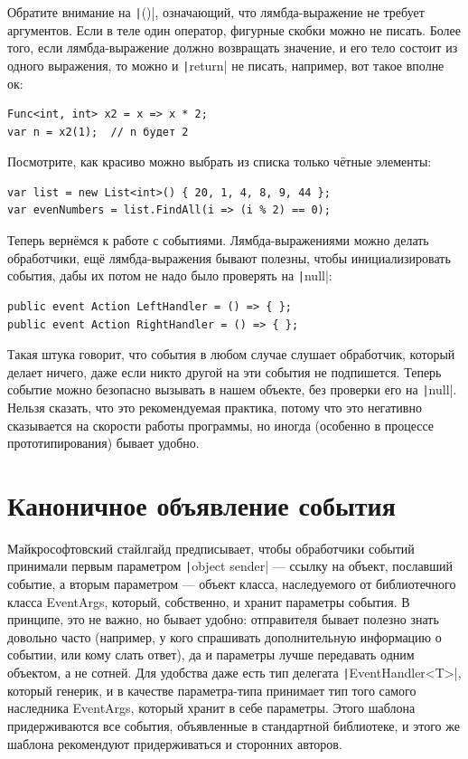 \documentclass[a5paper]{article}
\begin{document}
Обратите внимание на \texttt|()|, означающий, что лямбда-выражение не требует аргументов. Если в теле один оператор, фигурные скобки можно не писать. Более того, если лямбда-выражение должно возвращать значение, и его тело состоит из одного выражения, то можно и \texttt|return| не писать, например, вот такое вполне ок:

\begin{verbatim}
Func<int, int> x2 = x => x * 2;
var n = x2(1);  // n будет 2
\end{verbatim}

Посмотрите, как красиво можно выбрать из списка только чётные элементы:

\begin{verbatim}
var list = new List<int>() { 20, 1, 4, 8, 9, 44 };
var evenNumbers = list.FindAll(i => (i % 2) == 0);
\end{verbatim}

Теперь вернёмся к работе с событиями. Лямбда-выражениями можно делать обработчики, ещё лямбда-выражения бывают полезны, чтобы инициализировать события, дабы их потом не надо было проверять на \texttt|null|:

\begin{verbatim}
public event Action LeftHandler = () => { };
public event Action RightHandler = () => { };
\end{verbatim}

Такая штука говорит, что события в любом случае слушает обработчик, который делает ничего, даже если никто другой на эти события не подпишется. Теперь событие можно безопасно вызывать в нашем объекте, без проверки его на \texttt|null|. Нельзя сказать, что это рекомендуемая практика, потому что это негативно сказывается на скорости работы программы, но иногда (особенно в процессе прототипирования) бывает удобно.

\section{Каноничное объявление события}

Майкрософтовский стайлгайд предписывает, чтобы обработчики событий принимали первым параметром \texttt|object sender| --- ссылку на объект, пославший событие, а вторым параметром --- объект класса, наследуемого от библиотечного класса EventArgs, который, собственно, и хранит параметры события. В принципе, это не важно, но бывает удобно: отправителя бывает полезно знать довольно часто (например, у кого спрашивать дополнительную информацию о событии, или кому слать ответ), да и параметры лучше передавать одним объектом, а не сотней. Для удобства даже есть тип делегата \texttt|EventHandler<T>|, который генерик, и в качестве параметра-типа принимает тип того самого наследника EventArgs, который хранит в себе параметры. Этого шаблона придерживаются все события, объявленные в стандартной библиотеке, и этого же шаблона рекомендуют придерживаться и сторонних авторов.
\end{document}

